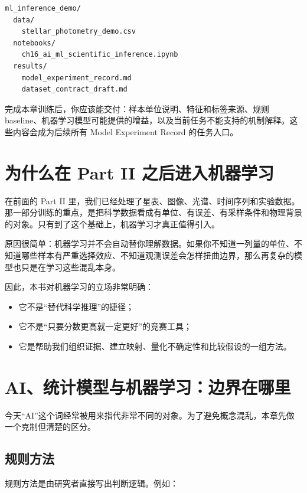 \begin{examplebox}[最小机器学习问题定义项目]
\begin{lstlisting}[style=terminal]
ml_inference_demo/
  data/
    stellar_photometry_demo.csv
  notebooks/
    ch16_ai_ml_scientific_inference.ipynb
  results/
    model_experiment_record.md
    dataset_contract_draft.md
\end{lstlisting}
\end{examplebox}

完成本章训练后，你应该能交付：样本单位说明、特征和标签来源、规则 baseline、机器学习模型可能提供的增益，以及当前任务不能支持的机制解释。这些内容会成为后续所有 Model Experiment Record 的任务入口。

\section{为什么在 Part II 之后进入机器学习}

在前面的 Part II 里，我们已经处理了星表、图像、光谱、时间序列和实验数据。那一部分训练的重点，是把科学数据看成有单位、有误差、有采样条件和物理背景的对象。只有到了这个基础上，机器学习才真正值得引入。

原因很简单：机器学习并不会自动替你理解数据。如果你不知道一列量的单位、不知道哪些样本有严重选择效应、不知道观测误差会怎样扭曲边界，那么再复杂的模型也只是在学习这些混乱本身。

因此，本书对机器学习的立场非常明确：

\begin{itemize}
    \item 它不是“替代科学推理”的捷径；
    \item 它不是“只要分数更高就一定更好”的竞赛工具；
    \item 它是帮助我们组织证据、建立映射、量化不确定性和比较假设的一组方法。
\end{itemize}

\section{AI、统计模型与机器学习：边界在哪里}

今天“AI”这个词经常被用来指代非常不同的对象。为了避免概念混乱，本章先做一个克制但清楚的区分。

\subsection{规则方法}

规则方法是由研究者直接写出判断逻辑。例如：

